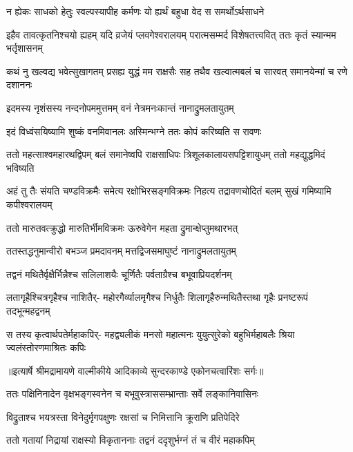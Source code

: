 \twolineshloka
{न ह्येकः साधको हेतुः स्वल्पस्यापीह कर्मणः}
{यो ह्यर्थं बहुधा वेद स समर्थोऽर्थसाधने} %

\fourlineindentedshloka
{इहैव तावत्कृतनिश्चयो ह्यहम्}
{यदि व्रजेयं प्लवगेश्वरालयम्}
{परात्मसम्मर्द विशेषतत्त्ववित्}
{ततः कृतं स्यान्मम भर्तृशासनम्} %

\fourlineindentedshloka
{कथं नु खल्वद्य भवेत्सुखागतम्}
{प्रसह्य युद्धं मम राक्षसैः सह}
{तथैव खल्वात्मबलं च सारवत्}
{समानयेन्मां च रणे दशाननः} %

\twolineshloka
{इदमस्य नृशंसस्य नन्दनोपममुत्तमम्}
{वनं नेत्रमनःकान्तं नानाद्रुमलतायुतम्} %

\twolineshloka
{इदं विध्वंसयिष्यामि शुष्कं वनमिवानलः}
{अस्मिन्भग्ने ततः कोपं करिष्यति स रावणः} %

\fourlineindentedshloka
{ततो महत्साश्वमहारथद्विपम्}
{बलं समानेष्वपि राक्षसाधिपः}
{त्रिशूलकालायसपट्टिशायुधम्}
{ततो महद्युद्धमिदं भविष्यति} %

\fourlineindentedshloka
{अहं तु तैः संयति चण्डविक्रमैः}
{समेत्य रक्षोभिरसङ्गविक्रमः}
{निहत्य तद्रावणचोदितं बलम्}
{सुखं गमिष्यामि कपीश्वरालयम्} %

\twolineshloka
{ततो मारुतवत्क्रुद्धो मारुतिर्भीमविक्रमः}
{ऊरुवेगेन महता द्रुमान्क्षेप्तुमथारभत्} %

\twolineshloka
{ततस्तद्धनुमान्वीरो बभञ्ज प्रमदावनम्}
{मत्तद्विजसमाघुष्टं नानाद्रुमलतायुतम्} %

\twolineshloka
{तद्वनं मथितैर्वृक्षैर्भिन्नैश्च सलिलाशयैः}
{चूर्णितैः पर्वताग्रैश्च बभूवाप्रियदर्शनम्} %

\fourlineindentedshloka
{लतागृहैश्चित्रगृहैश्च नाशितैर्-}
{महोरगैर्व्यालमृगैश्च निर्धुतैः}
{शिलागृहैरुन्मथितैस्तथा गृहैः}
{प्रनष्टरूपं तदभून्महद्वनम्} %

\fourlineindentedshloka
{स तस्य कृत्वार्थपतेर्महाकपिर्-}
{महद्व्यलीकं मनसो महात्मनः}
{युयुत्सुरेको बहुभिर्महाबलैः}
{श्रिया ज्वलंस्तोरणमाश्रितः कपिः} %


{॥इत्यार्षे श्रीमद्रामायणे वाल्मीकीये आदिकाव्ये सुन्दरकाण्डे एकोनचत्वारिंशः सर्गः॥}


\twolineshloka
{ततः पक्षिनिनादेन वृक्षभङ्गस्वनेन च}
{बभूवुस्त्राससम्भ्रान्ताः सर्वे लङ्कानिवासिनः} %

\twolineshloka
{विद्रुताश्च भयत्रस्ता विनेदुर्मृगपक्षुणः}
{रक्षसां च निमित्तानि क्रूराणि प्रतिपेदिरे} %

\twolineshloka
{ततो गतायां निद्रायां राक्षस्यो विकृताननाः}
{तद्वनं ददृशुर्भग्नं तं च वीरं महाकपिम्} %

